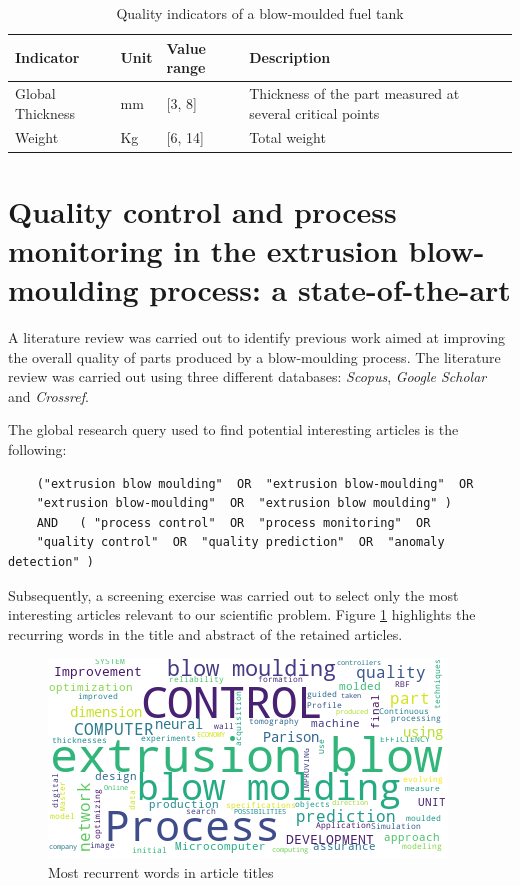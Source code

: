 \begin{table}[]
\caption{Quality indicators of a blow-moulded fuel tank }
\label{tab:quality_inidcators}
\begin{tabular}{@{}lllp{6cm}@{}}
\toprule
\textbf{Indicator} & \textbf{Unit} & \textbf{Value range} & \textbf{Description}                                                 \\ 
\midrule
Global Thickness           & mm                        & {[}3, 8{]}           & Thickness of the part measured at several critical points \\ 
Weight & Kg & {[}6, 14{]} & Total weight \\ 
\bottomrule
\end{tabular}
\end{table}


\section{Quality control and process monitoring in the extrusion blow-moulding process: a state-of-the-art} \label{state-of-the-art}

A literature review was carried out to identify previous work aimed at improving the overall quality of parts produced by a blow-moulding process. The literature review was carried out using three different databases: \textit{Scopus}, \textit{Google Scholar} and \textit{Crossref}.

The global research query used to find potential interesting articles is the following:

\begin{verbatim}
    ("extrusion blow moulding"  OR  "extrusion blow-moulding"  OR
    "extrusion blow-moulding"  OR  "extrusion blow moulding" )  
    AND   ( "process control"  OR  "process monitoring"  OR
    "quality control"  OR  "quality prediction"  OR  "anomaly detection" )
\end{verbatim}

Subsequently, a screening exercise was carried out to select only the most interesting articles relevant to our scientific problem. Figure \ref{fig:wordcloud} highlights the recurring words in the title and abstract of the retained articles. 

\begin{figure}
\centerline{\includegraphics[scale=1]{images/chapter_2/wordcloud.png}}
\caption{Most recurrent words in article titles}
\label{fig:wordcloud}
\end{figure}

